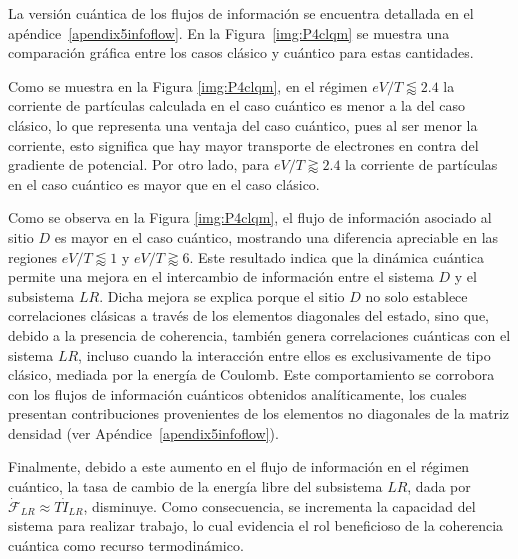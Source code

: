 La versión cuántica de los flujos de información se encuentra detallada en el apéndice~\ref{apendix5infoflow}. En la Figura~\ref{img:P4clqm} se muestra una comparación gráfica entre los casos clásico y cuántico para estas cantidades.


Como se muestra en la Figura \ref{img:P4clqm}, en el régimen $eV/T\lessapprox 2.4$ la corriente de partículas calculada en el caso cuántico es menor a la del caso clásico, lo que representa una ventaja del caso cuántico, pues al ser menor la corriente, esto significa que hay mayor transporte de electrones en contra del gradiente de potencial. Por otro lado, para $eV/T \gtrapprox 2.4$ la corriente de partículas en el caso cuántico es mayor que en el caso clásico. 

Como se observa en la Figura \ref{img:P4clqm}, el flujo de información asociado al sitio $D$ es mayor en el caso cuántico, mostrando una diferencia apreciable en las regiones $eV/T \lessapprox 1$ y $eV/T \gtrapprox 6$. Este resultado indica que la dinámica cuántica permite una mejora en el intercambio de información entre el sistema $D$ y el subsistema $LR$. Dicha mejora se explica porque el sitio $D$ no solo establece correlaciones clásicas a través de los elementos diagonales del estado, sino que, debido a la presencia de coherencia, también genera correlaciones cuánticas con el sistema $LR$, incluso cuando la interacción entre ellos es exclusivamente de tipo clásico, mediada por la energía de Coulomb. Este comportamiento se corrobora con los flujos de información cuánticos obtenidos analíticamente, los cuales presentan contribuciones provenientes de los elementos no diagonales de la matriz densidad (ver Apéndice~\ref{apendix5infoflow}).
 

Finalmente, debido a este aumento en el flujo de información en el régimen cuántico, la tasa de cambio de la energía libre del subsistema $LR$, dada por $\dot{\mathcal{F}}_{LR} \approx T\dot{I}_{LR}$, disminuye. Como consecuencia, se incrementa la capacidad del sistema para realizar trabajo, lo cual evidencia el rol beneficioso de la coherencia cuántica como recurso termodinámico.


\label{sec5:demonio}


